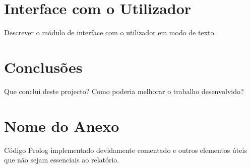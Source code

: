 \documentclass[a4paper]{article}
\begin{document}
\section{Interface com o Utilizador}

Descrever o módulo de interface com o utilizador em modo de texto.


\section{Conclusões}
Que conclui deste projecto? Como poderia melhorar o trabalho desenvolvido?


\clearpage
{}
\renewcommand\refname{Bibliografia}



\newpage
\appendix
\section{Nome do Anexo}
Código Prolog implementado devidamente comentado e outros elementos úteis que não sejam essenciais ao relatório.
\end{document}
